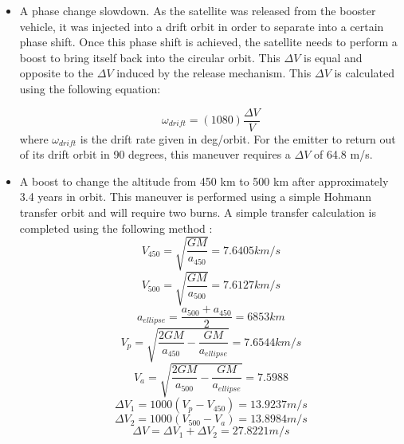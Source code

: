 \begin{itemize}
	\item A phase change slowdown. As the satellite was released from the booster vehicle, it was injected into a drift orbit in order to separate into a certain phase shift. Once this phase shift is achieved, the satellite needs to perform a boost to bring itself back into the circular orbit. This $\Delta V$ is equal and opposite to the $\Delta V$ induced by the release mechanism. This $\Delta V$ is calculated using the following equation:
	
		\begin{equation} 
 			\omega _{drift} = (1080)\frac{\Delta V}{V} 
		\end{equation}
	where $\omega _{drift}$ is the drift rate given in deg/orbit. For the emitter to return out of its drift orbit in 90 degrees, this maneuver requires a $\Delta V$ of 64.8 m/s.
	\item A boost to change the altitude from 450 km to 500 km after approximately 3.4 years in orbit. This maneuver is performed using a simple Hohmann transfer orbit and will require two burns. A simple transfer calculation is completed using the following method \cite{spacedesign}:
	\begin{equation} 
 			V_{450} = \sqrt{\frac{GM}{a_{450}}} =  7.6405 km/s
		\end{equation}
		\begin{equation} 
 			V_{500} = \sqrt{\frac{GM}{a_{500}}} = 7.6127 km/s
		\end{equation}
		\begin{equation}
			a_{ellipse} = \frac{a_{500}+a_{450}}{2} = 6853 km
		\end{equation}
		\begin{equation} 
 			V_{p} = \sqrt{\frac{2GM}{a_{450}}-\frac{GM}{a_{ellipse}}} = 7.6544 km/s
		\end{equation}
		\begin{equation} 
 			V_{a} = \sqrt{\frac{2GM}{a_{500}}-\frac{GM}{a_{ellipse}}} = 7.5988
		\end{equation}
			\begin{equation}
			\Delta V_1 = 1000(V_p - V_{450}) = 13.9237 m/s
		\end{equation}
		\begin{equation}
			\Delta V_2 = 1000(V_{500} - V_a) = 13.8984 m/s
		\end{equation}
		\begin{equation}
			\Delta V = \Delta V_1 + \Delta V_2 = 27.8221 m/s
		\end{equation}
		

\end{itemize}
